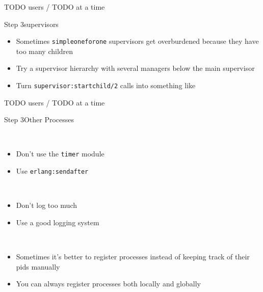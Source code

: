 \documentclass[utf8]{beamer}
\begin{document}
\begin{frame}
TODO users / TODO at a time
\end{frame}

\lstset{language=erlang}

\begin{frame}{Step 3}{supervisors}
	\begin{itemize}
		\item Sometimes \texttt{simple\textunderscore one\textunderscore for\textunderscore one} supervisors get \alert{overburdened} because they have too many children
		\item Try a supervisor hierarchy with several managers below the main supervisor
		\item Turn \texttt{supervisor:start\textunderscore child/2} calls into something like
		\startchild
	\end{itemize}
\end{frame}

\begin{frame}
TODO users / TODO at a time
\end{frame}

\begin{frame}{Step 3}{Other Processes}
	\begin{description}
		\item<+->[Timers]\ \\
			\begin{itemize}
				\item Don't use the \texttt{timer} module
				\item Use \texttt{erlang:send\textunderscore after}
			\end{itemize}
		\item<+->[Logging]\ \\
			\begin{itemize}
				\item Don't log too much
				\item Use a good logging system
			\end{itemize}
		\item<+->[Registration]\ \\
			\begin{itemize}
				\item Sometimes it's better to register processes instead of keeping track of their pids manually
				\item You can always register processes \alert{both} locally and globally
			\end{itemize}
	\end{description}
\end{frame}
\end{document}
